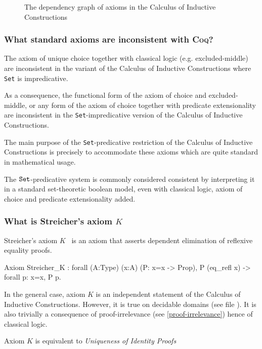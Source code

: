 \documentclass[a4paper,pdftex]{article}
\def\Question#1{\stepcounter{question}\subsubsection{#1}}
\def\Coq{\textsc{Coq}}
\def\Set{{\tt Set}}
\newcommand\vfile[2]{\ahref{#1}{\tt {#2}.v}}
\begin{document}
\begin{figure}[htbp]
\begin{center}
\ifpdf   %
\scalebox{0.65}{}
\else
\scalebox{0.65}{}
\fi
\end{center}
\caption{The dependency graph of axioms in the Calculus of Inductive Constructions}
\label{fig:axioms}
\end{figure}

\Question{What standard axioms are inconsistent with {\Coq}?}

The axiom of unique choice together with classical logic
(e.g. excluded-middle) are inconsistent in the variant of the Calculus
of Inductive Constructions where {\Set} is impredicative.

As a consequence, the functional form of the axiom of choice and
excluded-middle, or any form of the axiom of choice together with
predicate extensionality are inconsistent in the {\Set}-impredicative
version of the Calculus of Inductive Constructions.

The main purpose of the \Set-predicative restriction of the Calculus
of Inductive Constructions is precisely to accommodate these axioms
which are quite standard in mathematical usage.

The $\Set$-predicative system is commonly considered consistent by
interpreting it in a standard set-theoretic boolean model, even with
classical logic, axiom of choice and predicate extensionality added.

\Question{What is Streicher's axiom $K$}
\label{Streicher}

Streicher's axiom $K$~\cite{HofStr98} is an axiom that asserts
dependent elimination of reflexive equality proofs.

\begin{coq_example*}
Axiom Streicher_K :
  forall (A:Type) (x:A) (P: x=x -> Prop),
    P (eq_refl x) -> forall p: x=x, P p.
\end{coq_example*}

In the general case, axiom $K$ is an independent statement of the
Calculus of Inductive Constructions.  However, it is true on decidable
domains (see file \vfile{\LogicEqdepDec}{Eqdep\_dec}). It is also
trivially a consequence of proof-irrelevance (see
\ref{proof-irrelevance}) hence of classical logic.

Axiom $K$ is equivalent to {\em Uniqueness of Identity Proofs} \cite{HofStr98}
\end{document}
